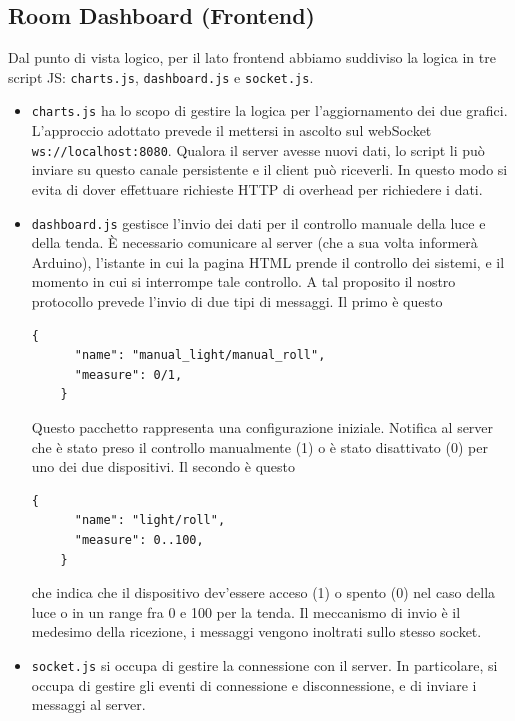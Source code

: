 \documentclass[a4paper,12pt]{report}
\begin{document}
\subsection{Room Dashboard (Frontend)}
Dal punto di vista logico, per il lato frontend abbiamo suddiviso la logica in tre script JS: \texttt{charts.js}, \texttt{dashboard.js} e \texttt{socket.js}.
\begin{itemize}
    \item \texttt{charts.js} ha lo scopo di gestire la logica per l'aggiornamento dei due grafici. L'approccio adottato prevede il mettersi in ascolto sul webSocket \texttt{ws://localhost:8080}. Qualora il server avesse nuovi dati, lo script li può inviare su questo canale persistente e il client può riceverli. In questo modo si evita di dover effettuare richieste HTTP di overhead per richiedere i dati.
    \item \texttt{dashboard.js} gestisce l'invio dei dati per il controllo manuale della luce e della tenda. È necessario comunicare al server (che a sua volta informerà Arduino), l'istante in cui la pagina HTML prende il controllo dei sistemi, e il momento in cui si interrompe tale controllo. A tal proposito il nostro protocollo prevede l'invio di due tipi di messaggi.
    Il primo è questo
    \begin{lstlisting}[style=json]
    {
      "name": "manual_light/manual_roll",
      "measure": 0/1,
    }
    \end{lstlisting}
    Questo pacchetto rappresenta una configurazione iniziale. Notifica al server che è stato preso il controllo manualmente (1) o è stato disattivato (0) per uno dei due dispositivi.
    Il secondo è questo
    \begin{lstlisting}[style=json]
    {
      "name": "light/roll",
      "measure": 0..100,
    }
    \end{lstlisting}
    che indica che il dispositivo dev'essere acceso (1) o spento (0) nel caso della luce o in un range fra 0 e 100 per la tenda. Il meccanismo di invio è il medesimo della ricezione, i messaggi vengono inoltrati sullo stesso socket.
    \item \texttt{socket.js} si occupa di gestire la connessione con il server. In particolare, si occupa di gestire gli eventi di connessione e disconnessione, e di inviare i messaggi al server.
\end{itemize}
\end{document}
